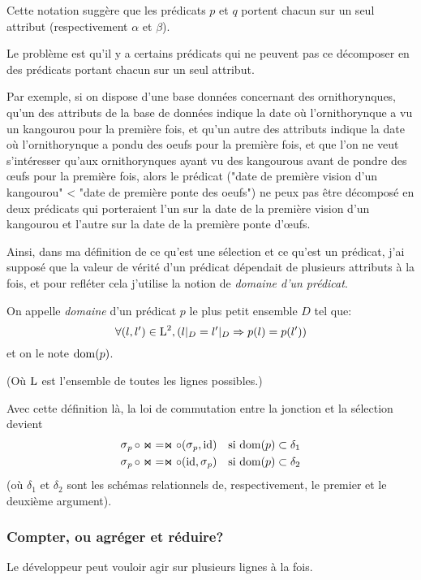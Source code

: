 Cette notation suggère que les prédicats $p$ et $q$ portent
chacun sur un seul attribut (respectivement $\alpha$ et $\beta$).

Le problème est qu'il y a certains prédicats qui ne peuvent
pas ce décomposer en des prédicats portant chacun sur un seul attribut.

Par exemple, si on dispose d'une base données concernant
des ornithorynques, qu'un des attributs de la base de données indique
la date où l'ornithorynque a vu un kangourou pour la première fois,
et qu'un autre des attributs indique la date où l'ornithorynque a pondu des oeufs
pour la première fois,
et que l'on ne veut s'intéresser qu'aux ornithorynques ayant vu des kangourous avant
de pondre des œufs pour la première fois, alors le prédicat
("date de première vision d'un kangourou" < "date de première ponte des oeufs")
ne peux pas être décomposé en deux prédicats qui porteraient l'un sur 
la date de la première vision d'un kangourou et l'autre sur la date de la 
première ponte d'œufs.

Ainsi, dans ma définition de ce qu'est une sélection et ce qu'est un prédicat,
j'ai supposé que la valeur de vérité d'un prédicat dépendait de plusieurs
attributs à la fois, et pour refléter cela j'utilise la notion de
\emph{domaine d'un prédicat}.

\begin{defi*}
On appelle \emph{domaine} d'un prédicat $p$ le plus petit
	ensemble $D$ tel que:
	$$
	\forall (l, l') \in \operatorname{L}^2, (l|_D = l'|_D \Rightarrow  p(l) = p(l')) 
	$$
	et on le note $\operatorname{dom}(p)$.
	
	(Où $\operatorname{L}$ est l'ensemble de toutes les lignes possibles.)
\end{defi*}

Avec cette définition là, la loi de commutation entre la jonction
et la sélection devient
\begin{align*}
\selP \circ \Join
& = \Join \circ (\selP, \id)
& \text{si $\dom(p) \subset \delta_1$}
\label{seljoin1}\\ 
\selP \circ \Join
& = \Join \circ (\id, \selP)
& \text{si $\dom(p) \subset \delta_2$}
\end{align*}
(où $\delta_1$ et $\delta_2$ sont les schémas relationnels de, respectivement,
le premier et le deuxième argument).

\subsubsection*{Compter, ou agréger et réduire?}
Le développeur peut vouloir agir sur plusieurs lignes à la fois.

